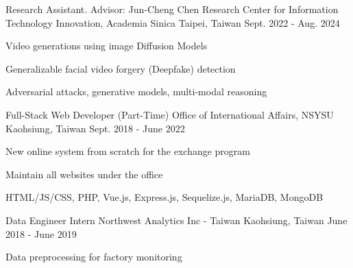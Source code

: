 

\begin{cventries}
  \cventry
    {Research Assistant. Advisor: Jun-Cheng Chen} %
    {Research Center for Information Technology Innovation, Academia Sinica} %
    {Taipei, Taiwan} %
    {Sept. 2022 - Aug. 2024} %
    {
      \begin{cvitems} %
        \item {Video generations using image Diffusion Models}
        \item {Generalizable facial video forgery (Deepfake) detection}
        \item {Adversarial attacks, generative models, multi-modal reasoning}
      \end{cvitems}
    }

  \cventry
    {Full-Stack Web Developer (Part-Time)} %
    {Office of International Affairs, NSYSU} %
    {Kaohsiung, Taiwan} %
    {Sept. 2018 - June 2022} %
    {
      \begin{cvitems} %
        \item {New online system from scratch for the exchange program}
        \item {Maintain all websites under the office}
        \item {HTML/JS/CSS, PHP, Vue.js, Express.js, Sequelize.js, MariaDB, MongoDB}
      \end{cvitems}
    }


  \cventry
    {Data Engineer Intern} %
    {Northwest Analytics Inc - Taiwan} %
    {Kaohsiung, Taiwan} %
    {June 2018 - June 2019} %
    {
      \begin{cvitems} %
        \item {Data preprocessing for factory monitoring}
      \end{cvitems}
    }

\end{cventries}
